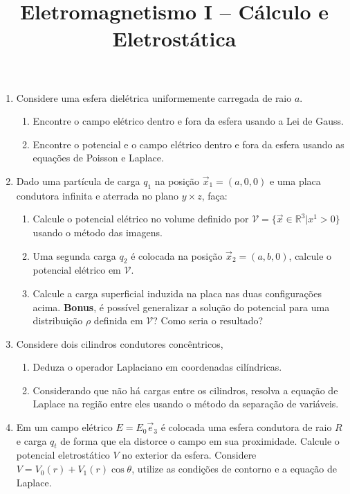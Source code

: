 \newif\ifuseseminar
\useseminartrue


\title{Eletromagnetismo I -- Cálculo e Eletrostática}	



\begin{enumerate}
	\item Considere uma esfera dielétrica uniformemente carregada de raio $a$.
	      \begin{enumerate}
		      \item Encontre o campo elétrico dentro e fora da esfera usando a Lei de Gauss.
		      \item Encontre o potencial e o campo elétrico dentro e fora da esfera
		            usando as equações de Poisson e Laplace.
	      \end{enumerate}
	\item Dado uma partícula de carga $q_1$ na posição $\vec{x}_1 = (a, 0, 0)$ e uma
	      placa condutora infinita e aterrada no plano $y \times z$, faça:
	      \begin{enumerate}
		      \item Calcule o potencial elétrico no volume definido por $\mathcal{V} =
			            \{\vec{x}\in\mathbb{R}^3|x^1>0\}$ usando o método das imagens.
		      \item Uma segunda carga $q_2$ é colocada na posição $\vec{x}_2 = (a, b,
			            0)$, calcule o potencial elétrico em $\mathcal{V}$.
		      \item Calcule a carga superficial induzida na placa nas duas configurações
		            acima. \textbf{Bonus}, é possível generalizar a solução do potencial
		            para uma distribuição $\rho$ definida em $\mathcal{V}$? Como seria o
		            resultado?
	      \end{enumerate}
	\item Considere dois cilindros condutores concêntricos,
	      \begin{enumerate}
		      \item Deduza o operador Laplaciano em coordenadas cilíndricas.
		      \item Considerando que não há cargas entre os cilindros, resolva a equação
		            de Laplace na região entre eles usando o método da separação de variáveis.
	      \end{enumerate}
	\item Em um campo elétrico $E = E_0\vec{e}_3$ é colocada uma esfera condutora de
	      raio $R$ e carga $q_t$ de forma que ela distorce o campo em sua proximidade.
	      Calcule o potencial eletrostático $V$ no exterior da esfera. Considere $V =
		      V_0(r) + V_1(r)\cos\theta$, utilize as condições de contorno e a equação de
	      Laplace.
\end{enumerate}

